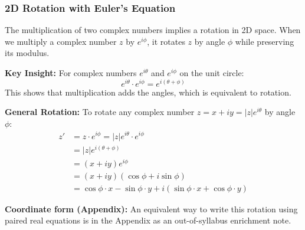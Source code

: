 \documentclass[12pt]{article}
\begin{document}
\begin{center}
\end{center}
\vspace{1em}

\subsubsection{2D Rotation with Euler's Equation}

The multiplication of two complex numbers implies a rotation in 2D space. When we multiply a complex number $z$ by $e^{i\phi}$, it rotates $z$ by angle $\phi$ while preserving its modulus.

\textbf{Key Insight:} For complex numbers $e^{i\theta}$ and $e^{i\phi}$ on the unit circle:
\[
e^{i\theta} \cdot e^{i\phi} = e^{i(\theta+\phi)}
\]
This shows that multiplication adds the angles, which is equivalent to rotation.

\textbf{General Rotation:} To rotate any complex number $z = x + iy = |z|e^{i\theta}$ by angle $\phi$:
\begin{align*}
z' &= z \cdot e^{i\phi} = |z|e^{i\theta} \cdot e^{i\phi}\\
&= |z|e^{i(\theta+\phi)}\\
&= (x + iy)e^{i\phi}\\
&= (x + iy)(\cos\phi + i\sin\phi)\\
&= \cos\phi \cdot x - \sin\phi \cdot y + i(\sin\phi \cdot x + \cos\phi \cdot y)
\end{align*}

\textbf{Coordinate form (Appendix):} An equivalent way to write this rotation using paired real equations is in the Appendix as an out-of-syllabus enrichment note.
\end{document}
